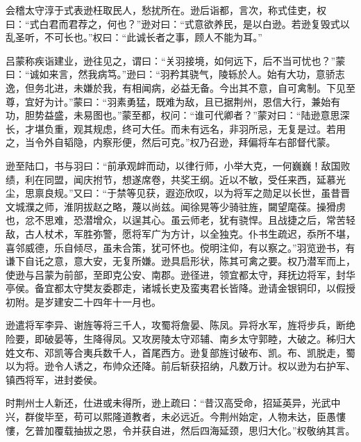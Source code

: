 \documentclass[12pt,UTF8]{ctexbook}
\begin{document}
会稽太守淳于式表逊枉取民人，愁扰所在。逊后诣都，言次，称式佳吏，权曰：“式白君而君荐之，何也？”逊对曰：“式意欲养民，是以白逊。若逊复毁式以乱圣听，不可长也。”权曰：“此诚长者之事，顾人不能为耳。”

吕蒙称疾诣建业，逊往见之，谓曰：“关羽接境，如何远下，后不当可忧也？”蒙曰：“诚如来言，然我病笃。”逊曰：“羽矜其骁气，陵轹於人。始有大功，意骄志逸，但务北进，未嫌於我，有相闻病，必益无备。今出其不意，自可禽制。下见至尊，宜好为计。”蒙曰：“羽素勇猛，既难为敌，且已据荆州，恩信大行，兼始有功，胆势益盛，未易图也。”蒙至都，权问：“谁可代卿者？”蒙对曰：“陆逊意思深长，才堪负重，观其规虑，终可大任。而未有远名，非羽所忌，无复是过。若用之，当令外自韬隐，内察形便，然后可克。”权乃召逊，拜偏将车右部督代蒙。

逊至陆口，书与羽曰：“前承观衅而动，以律行师，小举大克，一何巍巍！敌国败绩，利在同盟，闻庆拊节，想遂席卷，共奖王纲。近以不敏，受任来西，延慕光尘，思禀良规。”又曰：“于禁等见获，遐迩欣叹，以为将军之勋足以长世，虽昔晋文城濮之师，淮阴拔赵之略，蔑以尚兹。闻徐晃等少骑驻旌，闚望麾葆。操猾虏也，忿不思难，恐潜增众，以逞其心。虽云师老，犹有骁悍。且战捷之后，常苦轻敌，古人杖术，军胜弥警，愿将军广为方计，以全独克。仆书生疏迟，忝所不堪，喜邻威德，乐自倾尽，虽未合策，犹可怀也。傥明注仰，有以察之。”羽览逊书，有谦下自讬之意，意大安，无复所嫌。逊具启形状，陈其可禽之要。权乃潜军而上，使逊与吕蒙为前部，至即克公安、南郡。逊径进，领宜都太守，拜抚边将军，封华亭侯。备宜都太守樊友委郡走，诸城长吏及蛮夷君长皆降。逊请金银铜印，以假授初附。是岁建安二十四年十一月也。

逊遣将军李异、谢旌等将三千人，攻蜀将詹晏、陈凤。异将水军，旌将步兵，断绝险要，即破晏等，生降得凤。又攻房陵太守邓辅、南乡太守郭睦，大破之。秭归大姓文布、邓凯等合夷兵数千人，首尾西方。逊复部旌讨破布、凯。布、凯脱走，蜀以为将。逊令人诱之，布帅众还降。前后斩获招纳，凡数万计。权以逊为右护军、镇西将军，进封娄侯。

时荆州士人新还，仕进或未得所，逊上疏曰：“昔汉高受命，招延英异，光武中兴，群俊毕至，苟可以熙隆道教者，未必远近。今荆州始定，人物未达，臣愚慺慺，乞普加覆载抽拔之恩，令并获自进，然后四海延颈，思归大化。”权敬纳其言。
\end{document}
